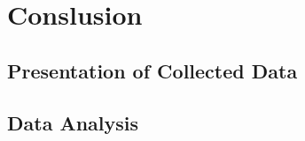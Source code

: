 \chapter{Conslusion}
\label{sec:conclusion}

\medskip\lipsum[1]


\section{Presentation of Collected Data}

\medskip\lipsum[1]

\section{Data Analysis}


\medskip\lipsum[3]
